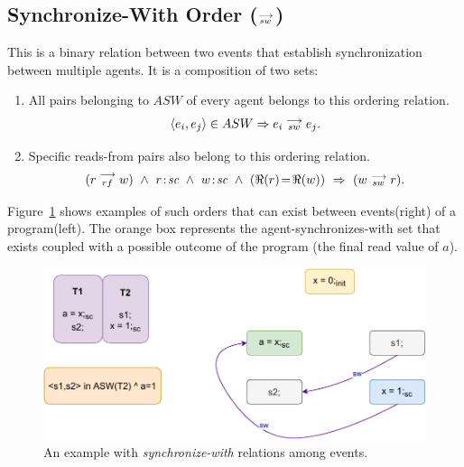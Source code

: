     \subsection{Synchronize-With Order ($\stackrel{\longrightarrow}{_{sw}} $)}
        This is a binary relation between two events that establish synchronization between multiple agents. 
        It is a composition of two sets: 
        \begin{enumerate}
            \item All pairs belonging to $ASW$ of every agent belongs to this ordering relation. 
                \begin{align*}
                    \langle e_i, e_j \rangle \in ASW \Rightarrow{} e_i\stackrel{\longrightarrow}{_{sw}}e_j. 
                \end{align*}
                    
            \item Specific reads-from pairs also belong to this ordering relation\footnotemark. 
                \begin{align*}
                    (\reln{r}{rf}{w}) \ \wedge \ \et{r}{sc} \ \wedge \ \et{w}{sc} \ \wedge \ (\Re(r)\!=\!\Re(w)) \ \Rightarrow{} \
                    (\reln{w}{sw}{r}).
                \end{align*}            
        \end{enumerate}
        Figure~\ref{model:sync-with} shows examples of such orders that can exist between events(right) of a program(left).
        The orange box represents the agent-synchronizes-with set that exists coupled with a possible outcome of the program (the final read value of $a$).
        \begin{figure}[H]
            \centering
            \includegraphics[scale=0.7]{3.ECMAScriptMemoryModel/SynchronizeWith.pdf}
            \caption{An example with \textit{synchronize-with} relations among events.}
            \label{model:sync-with}
        \end{figure}

